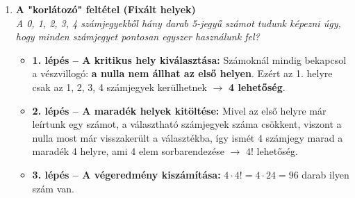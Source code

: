 \documentclass[11pt, a4paper]{article}
\begin{document}
\begin{enumerate}[label=\arabic*., leftmargin=*]
    \begin{center}
    \end{center}

    \vspace{0.4cm}

    \item \textbf{A "korlátozó" feltétel (Fixált helyek)}\\
    \textit{A 0, 1, 2, 3, 4 számjegyekből hány darab 5-jegyű számot tudunk képezni úgy, hogy minden számjegyet pontosan egyszer használunk fel?}
    \begin{itemize}
        \item \textbf{1. lépés – A kritikus hely kiválasztása:} Számoknál mindig bekapcsol a vészvillogó: \textbf{a nulla nem állhat az első helyen}. Ezért az 1. helyre csak az 1, 2, 3, 4 számjegyek kerülhetnek $\rightarrow$ \textbf{4 lehetőség}.
        \item \textbf{2. lépés – A maradék helyek kitöltése:} Mivel az első helyre már leírtunk egy számot, a választható számjegyek száma csökkent, viszont a nulla most már visszakerült a választékba, így ismét 4 számjegy marad a maradék 4 helyre, ami 4 elem sorbarendezése $\rightarrow$ $4!$ lehetőség.
        \item \textbf{3. lépés – A végeredmény kiszámítása:} $4 \cdot 4! = 4 \cdot 24 = 96$ darab ilyen szám van.
    \end{itemize}


\end{enumerate}
\end{document}
